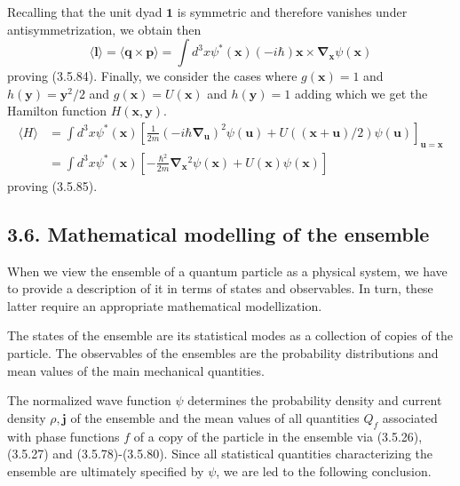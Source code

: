 \documentclass{article}
\begin{document}
Recalling that the unit dyad $\mathbf{1}$ is symmetric and therefore vanishes under antisymmetrization, we obtain then
$$
\begin{equation*}
\langle\boldsymbol{l}\rangle=\langle\boldsymbol{q} \times \boldsymbol{p}\rangle=\int d^{3} x \psi^{*}(\boldsymbol{x})(-i \hbar) \boldsymbol{x} \times \boldsymbol{\nabla}_{\boldsymbol{x}} \psi(\boldsymbol{x}) \tag{3.5.93}
\end{equation*}
$$
proving (3.5.84). Finally, we consider the cases where $g(\boldsymbol{x})=1$ and $h(\boldsymbol{y})=\boldsymbol{y}^{2} / 2$ and $g(\boldsymbol{x})=U(\boldsymbol{x})$ and $h(\boldsymbol{y})=1$ adding which we get the Hamilton function $H(\boldsymbol{x}, \boldsymbol{y})$.
$$
\begin{align*}
\langle H\rangle & =\int d^{3} x \psi^{*}(\boldsymbol{x})\left[\frac{1}{2 m}\left(-i \hbar \boldsymbol{\nabla}_{\boldsymbol{u}}\right)^{2} \psi(\boldsymbol{u})+U((\boldsymbol{x}+\boldsymbol{u}) / 2) \psi(\boldsymbol{u})\right]_{\boldsymbol{u}=\boldsymbol{x}}  \tag{3.5.94}\\
& =\int d^{3} x \psi^{*}(\boldsymbol{x})\left[-\frac{\hbar^{2}}{2 m} \boldsymbol{\nabla}_{\boldsymbol{x}}{ }^{2} \psi(\boldsymbol{x})+U(\boldsymbol{x}) \psi(\boldsymbol{x})\right]
\end{align*}
$$
proving (3.5.85).

\subsection*{3.6. Mathematical modelling of the ensemble}

When we view the ensemble of a quantum particle as a physical system, we have to provide a description of it in terms of states and observables. In turn, these latter require an appropriate mathematical modellization.

The states of the ensemble are its statistical modes as a collection of copies of the particle. The observables of the ensembles are the probability distributions and mean values of the main mechanical quantities.

The normalized wave function $\psi$ determines the probability density and current density $\rho, \boldsymbol{j}$ of the ensemble and the mean values of all quantities $Q_{f}$ associated with phase functions $f$ of a copy of the particle in the ensemble via (3.5.26), (3.5.27) and (3.5.78)-(3.5.80). Since all statistical quantities characterizing the ensemble are ultimately specified by $\psi$, we are led to the following conclusion.
\end{document}
